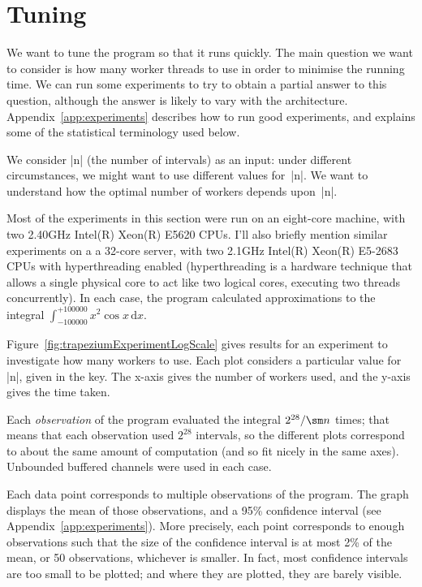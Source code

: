 \section{Tuning}
\label{sec:trapezium-tuning}

We want to tune the program so that it runs quickly.  The main question we
want to consider is how many worker threads to use in order to minimise the
running time.
We can run some experiments to try to obtain  a partial answer to
this question, although the answer is likely to vary with the architecture.
%
Appendix~\ref{app:experiments} describes how to run good experiments, and
explains some of the statistical terminology used below. 

We consider |n| (the number of intervals) as an input: under different
circumstances, we might want to use different values for~|n|.  We want to
understand how the optimal number of workers depends upon~|n|.

Most of the experiments in this section were run on an eight-core machine, with
two 2.40GHz Intel(R) Xeon(R) E5620 CPUs.
%
I'll also briefly mention similar experiments on a a 32-core server, with two
2.1GHz Intel(R) Xeon(R) E5-2683 CPUs with hyperthreading enabled
(hyperthreading is a hardware technique that allows a single physical core to
act like two logical cores, executing two threads concurrently).
%
In each case, the program calculated approximations to the integral 
$\int_{-100000}^{+100000} x^2 \cos x \, \mbox{d}x$.


Figure~\ref{fig:trapeziumExperimentLogScale} gives results for an experiment
to investigate how many workers to use.  
%
Each plot considers a particular value for |n|, given in the key.
%
The x-axis gives the number of workers used, and the y-axis gives the time
taken.  

Each \emph{observation} of the program evaluated the integral $2^{28}/\sm n$
times; that means that each observation used $2^{28}$ intervals, so the
different plots correspond to about the same amount of computation (and so fit
nicely in the same axes).  Unbounded buffered channels were used in each case.

Each data point corresponds to multiple observations of the program.  The
graph displays the mean of those observations, and a 95\% confidence interval
(see Appendix~\ref{app:experiments}).  More precisely, each point corresponds
to enough observations such that the size of the confidence interval is at
most 2\% of the mean, or 50 observations, whichever is smaller.  In fact, most
confidence intervals are too small to be plotted; and where they are plotted,
they are barely visible.

